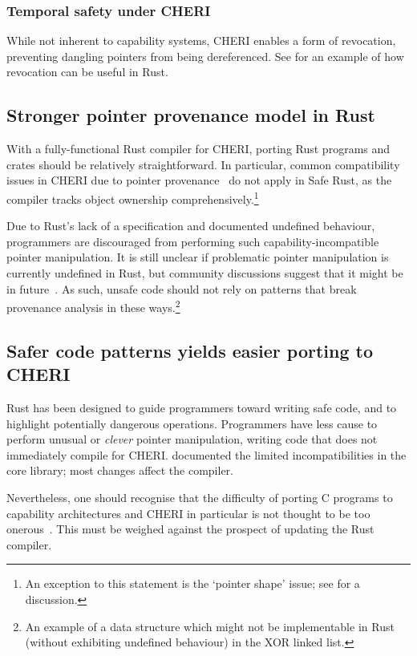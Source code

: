 \documentclass[dissertation.tex]{subfiles}
\begin{document}
\subsubsection{Temporal safety under CHERI}
While not inherent to capability systems, CHERI enables a form of
revocation, preventing dangling pointers from being dereferenced.
See  for an example of how revocation
can be useful in Rust.


\subsection{Stronger pointer provenance model in Rust}
\label{sec:eval-cheri-provenance}

With a fully-functional Rust compiler for CHERI, porting Rust programs
and crates should be relatively straightforward.
In particular, common compatibility issues in CHERI due to pointer
provenance~\cite{cheri-2019-abstract} do not apply in Safe Rust,
as the compiler tracks object ownership comprehensively.\footnote{
An exception to this statement is the `pointer shape' issue; see
 for a discussion.
}

Due to Rust's lack of a specification and documented undefined
behaviour, programmers are discouraged from performing such
capability-incompatible pointer manipulation.
It is still unclear if problematic pointer manipulation is currently
undefined in Rust, but community discussions suggest that it might be in
future~\cite{rust-ucg-provenance}.
As such, unsafe code should not rely on patterns that break provenance
analysis in these ways.\footnote{
An example of a data structure which might not be implementable in Rust
(without exhibiting undefined behaviour) in the XOR linked list.
}


\subsection{Safer code patterns yields easier porting to CHERI}
\label{sec:eval-cheri-port}

Rust has been designed to guide programmers toward writing safe code,
and to highlight potentially dangerous operations.
Programmers have less cause to perform unusual or \emph{clever} pointer
manipulation, writing code that does not immediately compile for CHERI.
 documented the limited incompatibilities in the
core library; most changes affect the compiler.

Nevertheless, one should recognise that the difficulty of porting C
programs to capability architectures and CHERI in particular is not
thought to be too onerous~\cite{capsicum-usability}.
This must be weighed against the prospect of updating the Rust compiler.
\end{document}
